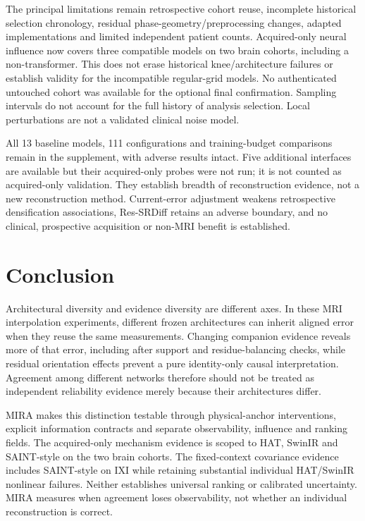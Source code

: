 \documentclass[10pt,twocolumn,letterpaper]{article}
\begin{document}
The principal limitations remain retrospective cohort reuse, incomplete historical selection chronology, residual phase-geometry/preprocessing changes, adapted implementations and limited independent patient counts. Acquired-only neural influence now covers three compatible models on two brain cohorts, including a non-transformer. This does not erase historical knee/architecture failures or establish validity for the incompatible regular-grid models. No authenticated untouched cohort was available for the optional final confirmation. Sampling intervals do not account for the full history of analysis selection. Local perturbations are not a validated clinical noise model.

All 13 baseline models, 111 configurations and training-budget comparisons remain in the supplement, with adverse results intact. Five additional interfaces are available but their acquired-only probes were not run; it is not counted as acquired-only validation. They establish breadth of reconstruction evidence, not a new reconstruction method. Current-error adjustment weakens retrospective densification associations, Res-SRDiff retains an adverse boundary, and no clinical, prospective acquisition or non-MRI benefit is established.

\section{Conclusion}
Architectural diversity and evidence diversity are different axes. In these MRI interpolation experiments, different frozen architectures can inherit aligned error when they reuse the same measurements. Changing companion evidence reveals more of that error, including after support and residue-balancing checks, while residual orientation effects prevent a pure identity-only causal interpretation. Agreement among different networks therefore should not be treated as independent reliability evidence merely because their architectures differ.

MIRA makes this distinction testable through physical-anchor interventions, explicit information contracts and separate observability, influence and ranking fields. The acquired-only mechanism evidence is scoped to HAT, SwinIR and SAINT-style on the two brain cohorts. The fixed-context covariance evidence includes SAINT-style on IXI while retaining substantial individual HAT/SwinIR nonlinear failures. Neither establishes universal ranking or calibrated uncertainty. MIRA measures when agreement loses observability, not whether an individual reconstruction is correct.

\clearpage
{\small}
\end{document}
